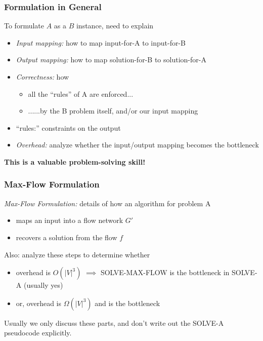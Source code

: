\documentclass[10pt,aspectratio=169]{beamer}
\begin{document}
\begin{frame} \frametitle{Formulation in General}
  To formulate $A$ as a $B$ instance, need to explain
  \begin{itemize}
  \item \emph{Input mapping:} how to map input-for-A to input-for-B
  \item \emph{Output mapping:} how to map solution-for-B to solution-for-A
  \item \emph{Correctness:} how
    \begin{itemize}
    \item all the ``rules'' of A are enforced...
    \item ......by the B problem itself, and/or our input mapping
    \end{itemize}
  \item ``rules:'' constraints on the output
  \item \emph{Overhead:} analyze whether the input/output mapping becomes the bottleneck
  \end{itemize}

  \vspace{.5cm}
  \textbf{This is a valuable problem-solving skill!}
\end{frame}

\begin{frame} \frametitle{Max-Flow Formulation}

\emph{Max-Flow Formulation:} details of how an algorithm for problem A
\begin{itemize}
  \item maps an input into a flow network $G'$
  \item recovers a solution from the flow $f$
\end{itemize}
\vspace{.5cm}
Also: analyze these steps to determine whether
\begin{itemize}
  \item overhead is $O(|V|^3)$ $\implies$ SOLVE-MAX-FLOW
    is the bottleneck in SOLVE-A (usually yes)
  \item or, overhead is $\Omega(|V|^3)$ and is the bottleneck
\end{itemize}
\vspace{.5cm}
Usually we only discuss these parts, and don't write out the SOLVE-A pseudocode
explicitly.
\end{frame}
\end{document}

